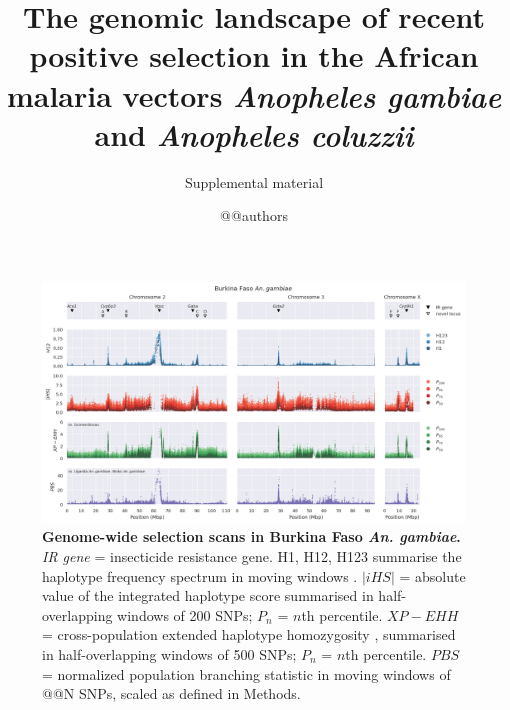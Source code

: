 \documentclass[a4paper,11pt,abstracton,hidelinks]{scrartcl}
\title{
The genomic landscape of recent positive selection in the African malaria vectors \textit{Anopheles gambiae} and \textit{Anopheles coluzzii}
}
\subtitle{\large{Supplemental material}}
\author{@@authors}
\begin{document}
\maketitle

\beginsupplement

\clearpage


\renewcommand{\listfigurename}{Supplemental figures}
\listoffigures

\begin{landscape}

\begin{figure}[t!]
	\begin{center}
		\includegraphics*[width=1.05\linewidth,center]{artwork/gwss_bf_gam_gw_ug_gam_gq_gam.png}
	\end{center}
	\caption[Genome-wide selection scans in Burkina Faso \textit{An. gambiae}]{
	\textbf{Genome-wide selection scans in Burkina Faso \textit{An. gambiae}.} 
	\textit{IR gene} = insecticide resistance gene. 
	H1, H12, H123 summarise the haplotype frequency spectrum in moving windows \citep{Garud2015}. 
	$|iHS|$ = absolute value of the integrated haplotype score \citep{Voight2006} summarised in half-overlapping windows of 200 SNPs; $P_{n}$ = $n$th percentile. 
	$XP-EHH$ = cross-population extended haplotype homozygosity \citep{Sabeti2007}, summarised in half-overlapping windows of 500 SNPs; $P_{n}$ = $n$th percentile.
	$PBS$ = normalized population branching statistic \citep{Crawford2017} in moving windows of @@N SNPs, scaled as defined in Methods.
	} 
	\label{fig:gwss_bf_gam}
\end{figure}



\end{landscape}
\end{document}
